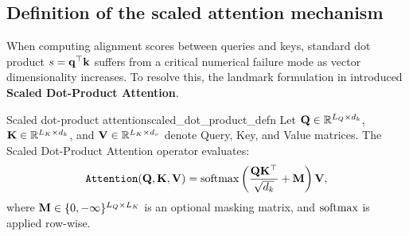 \documentclass[../../main.tex]{subfiles}
\begin{document}
\subsection{Definition of the scaled attention mechanism}
\label{subsec:scaled_dot_product_defn}

When computing alignment scores between queries and keys, standard dot product $s = \mathbf{q}^\top \mathbf{k}$ suffers from a critical numerical failure mode as vector dimensionality increases. To resolve this, the landmark formulation in \cite{vaswani2017} introduced \textbf{Scaled Dot-Product Attention}.

\begin{definition}{Scaled dot-product attention}{scaled_dot_product_defn}
Let $\mathbf{Q} \in \mathbb{R}^{L_Q \times d_k}$, $\mathbf{K} \in \mathbb{R}^{L_K \times d_k}$, and $\mathbf{V} \in \mathbb{R}^{L_K \times d_v}$ denote Query, Key, and Value matrices. The Scaled Dot-Product Attention operator evaluates:
\begin{equation}
\label{eq:scaled_dot_product_matrix}
\text{\texttt{Attention}}(\mathbf{Q}, \mathbf{K}, \mathbf{V}) = \operatorname{\mathrm{softmax}}\left( \frac{\mathbf{Q} \mathbf{K}^\top}{\sqrt{d_k}} + \mathbf{M} \right) \mathbf{V},
\end{equation}
where $\mathbf{M} \in \{0, -\infty\}^{L_Q \times L_K}$ is an optional masking matrix, and $\operatorname{\mathrm{softmax}}$ is applied row-wise.
\end{definition}
\end{document}
